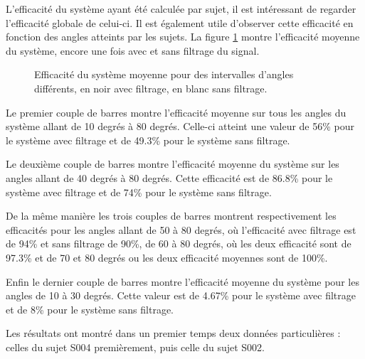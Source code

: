 \documentclass[letterpaper, twoside, 12pt, memoire, creativecommons, hyperref]{thETS}
\begin{document}
L'efficacité du système ayant été calculée par sujet, il est intéressant de regarder l'efficacité globale de celui-ci. Il est également utile d'observer cette efficacité en fonction des angles atteints par les sujets. La figure \ref{fig:compeff} montre l'efficacité moyenne du système, encore une fois avec et sans filtrage du signal. 

\begin{figure}
	\centering
	\caption{Efficacité du système moyenne pour des intervalles d'angles différents, en noir avec filtrage, en blanc sans filtrage.}
	\label{fig:compeff}
\end{figure}

Le premier couple de barres montre l'efficacité moyenne sur tous les angles du système allant de 10 degrés à 80 degrés. Celle-ci atteint une valeur de 56\% pour le système avec filtrage et de 49.3\% pour le système sans filtrage. 

Le deuxième couple de barres montre l'efficacité moyenne du système sur les angles allant de 40 degrés à 80 degrés. Cette efficacité est de 86.8\% pour le système avec filtrage et de 74\% pour le système sans filtrage. 

De la même manière les trois couples de barres montrent respectivement les efficacités pour les angles allant de 50 à 80 degrés, où l'efficacité avec filtrage est de 94\% et sans filtrage de 90\%, de 60 à 80 degrés, où les deux efficacité sont de 97.3\% et de 70 et 80 degrés ou les deux efficacité moyennes sont de 100\%. 

Enfin le dernier couple de barres montre l'efficacité moyenne du système pour les angles de 10 à 30 degrés. Cette valeur est de 4.67\% pour le système avec filtrage et de 8\% pour le système sans filtrage.

Les résultats ont montré dans un premier temps deux données particulières : celles du sujet S004 premièrement, puis celle du sujet S002. 
\end{document}
